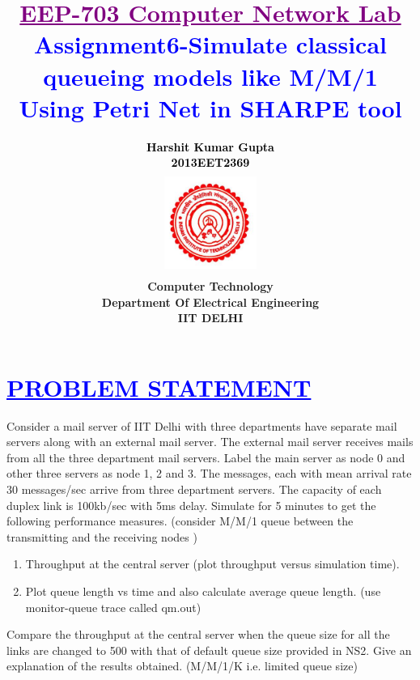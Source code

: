 \documentclass[a4paper,12pt]{report}
\title{\bfseries\huge \textcolor{purple}{\underline {EEP-703 Computer Network Lab}} \\{\textcolor{blue}{Assignment6-Simulate classical queueing models like M/M/1 Using Petri Net in SHARPE tool}}}
\author{\bfseries\large\textcolor{black}  {Harshit Kumar Gupta}\\ {\textcolor{black} {2013EET2369 }}\\
\includegraphics[width=3cm,height=3.4cm]{./iit.png}\\\noindent Computer Technology\\
\noindent Department Of Electrical Engineering\\IIT DELHI}
\begin{document}
\maketitle
\tableofcontents



\chapter{\textcolor{blue}{\underline {PROBLEM STATEMENT}}}
\noindent 

Consider a mail server of IIT Delhi with three departments have separate mail servers along
with an external mail server. The external mail server receives mails from all the three
department mail servers. Label the main server as node 0 and other three servers as node 1, 2
and 3. The messages, each with mean arrival rate 30 messages/sec arrive from three
department servers. The capacity of each duplex link is 100kb/sec with 5ms delay. Simulate
for 5 minutes to get the following performance measures. (consider M/M/1 queue between
the transmitting and the receiving nodes )

	
	\begin{enumerate}
	  \item Throughput at the central server (plot throughput versus simulation time).
	  \item  Plot queue length vs time and also calculate average queue length. (use monitor-queue
                 trace called qm.out)
	\end{enumerate}
	\noindent Compare the throughput at the central server when the queue size for all the links are changed
to 500 with that of default queue size provided in NS2. Give an explanation of the results
obtained. (M/M/1/K i.e. limited queue size)\\
\end{document}
